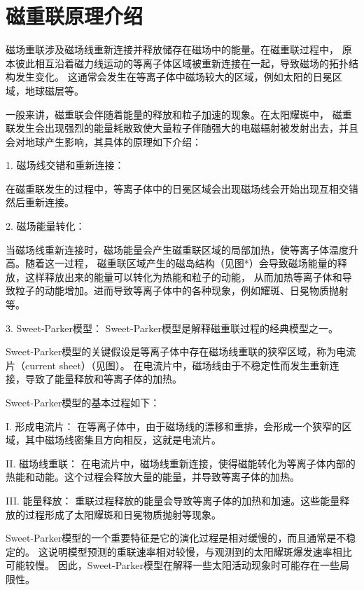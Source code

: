 \section[\textnormal{磁重联原理介绍}]{\textbf{磁重联原理介绍}}

磁场重联涉及磁场线重新连接并释放储存在磁场中的能量。在磁重联过程中，
原本彼此相互沿着磁力线运动的等离子体区域被重新连接在一起，导致磁场的拓扑结构发生变化。
这通常会发生在等离子体中磁场较大的区域\cite{2009ARA&A..47..291Z}，例如太阳的日冕区域，地球磁层等。

一般来讲，磁重联会伴随着能量的释放和粒子加速的现象。在太阳耀斑中，
磁重联发生会出现强烈的能量耗散致使大量粒子伴随强大的电磁辐射被发射出去，并且会对地球产生影响，其具体的原理如下介绍：

1.	磁场线交错和重新连接\cite{2009ARA&A..47..291Z}： 

在磁重联发生的过程中，等离子体中的日冕区域会出现磁场线会开始出现互相交错然后重新连接。

2.	磁场能量转化\cite{GU2023100018}： 

当磁场线重新连接时，磁场能量会产生磁重联区域的局部加热，使等离子体温度升高。随着这一过程，
磁重联区域产生的磁岛结构（见图*）会导致磁场能量的释放，这样释放出来的能量可以转化为热能和粒子的动能，
从而加热等离子体和导致粒子的动能增加。进而导致等离子体中的各种现象，例如耀斑、日冕物质抛射等。

3.	Sweet-Parker模型\cite{annurev:/content/journals/10.1146/annurev-astro-082708-101726, 1958IAUS....6..123S, Yang_2019}：
Sweet-Parker模型是解释磁重联过程的经典模型之一。

Sweet-Parker模型的关键假设是等离子体中存在磁场线重联的狭窄区域，称为电流片（current sheet）（见图）。
在电流片中，磁场线由于不稳定性而发生重新连接，导致了能量释放和等离子体的加热。

Sweet-Parker模型的基本过程如下：

I. 形成电流片： 在等离子体中，由于磁场线的漂移和重排，会形成一个狭窄的区域，其中磁场线密集且方向相反，这就是电流片。

II. 磁场线重联： 在电流片中，磁场线重新连接，使得磁能转化为等离子体内部的热能和动能。这个过程会释放大量的能量，并导致等离子体的加热。

III. 能量释放： 重联过程释放的能量会导致等离子体的加热和加速。这些能量释放的过程形成了太阳耀斑和日冕物质抛射等现象。

Sweet-Parker模型的一个重要特征是它的演化过程是相对缓慢的\cite{2009ARA&A..47..291Z}，而且通常是不稳定的。
这说明模型预测的重联速率相对较慢，与观测到的太阳耀斑爆发速率相比可能较慢。
因此，Sweet-Parker模型在解释一些太阳活动现象时可能存在一些局限性。

